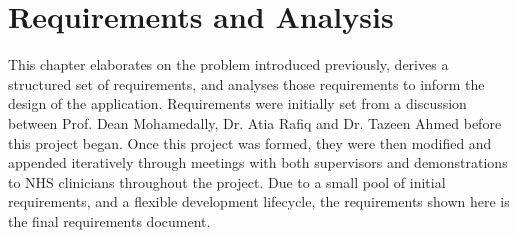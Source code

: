 \chapter{Requirements and Analysis}

This chapter elaborates on the problem introduced previously, derives a structured set of requirements, and analyses those requirements to inform the design of the application. Requirements were initially set from a discussion between Prof. Dean Mohamedally, Dr. Atia Rafiq and Dr. Tazeen Ahmed before this project began. Once this project was formed, they were then modified and appended iteratively through meetings with both supervisors and demonstrations to NHS clinicians throughout the project. Due to a small pool of initial requirements, and a flexible development lifecycle, the requirements shown here is the final requirements document.

